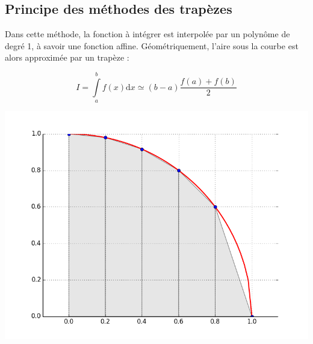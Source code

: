 \documentclass[10pt,fleqn]{article} %
\begin{document}
\subsection*{Principe des méthodes des trapèzes}
\begin{minipage}[c]{.7\linewidth}
\begin{defi}
Dans cette méthode, la fonction à intégrer est interpolée par un polynôme de degré 1, à savoir une fonction affine. Géométriquement, l'aire sous la courbe est alors approximée par un trapèze :

$$
I = \int\limits_a^{b} f(x) \mathrm{d}x \simeq \left(b-a\right) \dfrac{f(a)+f(b)}{2} 
$$
\end{defi}
\end{minipage}\hfill
\begin{minipage}[c]{.24\linewidth}
\begin{center}
\includegraphics[width=.99\textwidth]{images/pi_trap}
\end{center}
\end{minipage}
\end{document}
